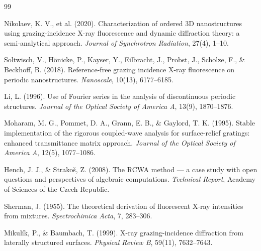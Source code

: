 \documentclass[a4paper,11pt]{article}
\begin{document}
\begin{thebibliography}{99}

Nikolaev, K. V., et al. (2020). Characterization of ordered 3D nanostructures using grazing-incidence X-ray fluorescence and dynamic diffraction theory: a semi-analytical approach. \textit{Journal of Synchrotron Radiation}, 27(4), 1--10.

Soltwisch, V., Hönicke, P., Kayser, Y., Eilbracht, J., Probst, J., Scholze, F., \& Beckhoff, B. (2018). Reference-free grazing incidence X-ray fluorescence on periodic nanostructures. \textit{Nanoscale}, 10(13), 6177--6185.

Li, L. (1996). Use of Fourier series in the analysis of discontinuous periodic structures. \textit{Journal of the Optical Society of America A}, 13(9), 1870--1876.

Moharam, M. G., Pommet, D. A., Grann, E. B., \& Gaylord, T. K. (1995). Stable implementation of the rigorous coupled-wave analysis for surface-relief gratings: enhanced transmittance matrix approach. \textit{Journal of the Optical Society of America A}, 12(5), 1077--1086.

Hench, J. J., \& Strakoš, Z. (2008). The RCWA method — a case study with open questions and perspectives of algebraic computations. \textit{Technical Report}, Academy of Sciences of the Czech Republic.

Sherman, J. (1955). The theoretical derivation of fluorescent X-ray intensities from mixtures. \textit{Spectrochimica Acta}, 7, 283--306.

Mikulík, P., \& Baumbach, T. (1999). X-ray grazing-incidence diffraction from laterally structured surfaces. \textit{Physical Review B}, 59(11), 7632--7643.

\end{thebibliography}
\end{document}
